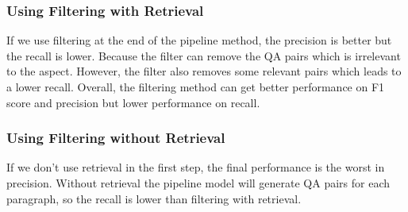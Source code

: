 \subsubsection{Using Filtering with Retrieval}
If we use filtering at the end of the pipeline method, the precision is better but the recall is lower. Because the filter can remove the QA pairs which is irrelevant to the aspect. However, the filter also removes some relevant pairs which leads to a lower recall. Overall, the filtering method can get better performance on F1 score and precision but lower performance on recall.

\subsubsection{Using Filtering without Retrieval}
If we don't use retrieval in the first step, the final performance is the worst in precision. Without retrieval the pipeline model will generate QA pairs for each paragraph, so the recall is lower than filtering with retrieval.  



